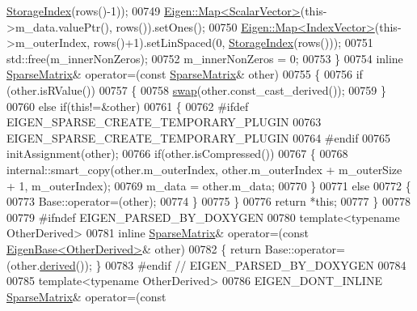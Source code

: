 \begin{DoxyCode}
      \hyperlink{group___sparse_core___module_a0b540ba724726ebe953f8c0df06081ed}{StorageIndex}(rows()-1));
00749       \hyperlink{group___core___module_class_eigen_1_1_map}{Eigen::Map<ScalarVector>}(this->m\_data.valuePtr(), rows()).setOnes();
00750       \hyperlink{group___core___module_class_eigen_1_1_map}{Eigen::Map<IndexVector>}(this->m\_outerIndex, rows()+1).setLinSpaced(0, 
      \hyperlink{group___sparse_core___module_a0b540ba724726ebe953f8c0df06081ed}{StorageIndex}(rows()));
00751       std::free(m\_innerNonZeros);
00752       m\_innerNonZeros = 0;
00753     \}
00754     \textcolor{keyword}{inline} \hyperlink{group___sparse_core___module_class_eigen_1_1_sparse_matrix}{SparseMatrix}& operator=(\textcolor{keyword}{const} \hyperlink{group___sparse_core___module_class_eigen_1_1_sparse_matrix}{SparseMatrix}& other)
00755     \{
00756       \textcolor{keywordflow}{if} (other.isRValue())
00757       \{
00758         \hyperlink{endian_8c_a3ca5ecd34b04d6a243c054ac3a57f68d}{swap}(other.const\_cast\_derived());
00759       \}
00760       \textcolor{keywordflow}{else} \textcolor{keywordflow}{if}(\textcolor{keyword}{this}!=&other)
00761       \{
00762 \textcolor{preprocessor}{        #ifdef EIGEN\_SPARSE\_CREATE\_TEMPORARY\_PLUGIN}
00763           EIGEN\_SPARSE\_CREATE\_TEMPORARY\_PLUGIN
00764 \textcolor{preprocessor}{        #endif}
00765         initAssignment(other);
00766         \textcolor{keywordflow}{if}(other.isCompressed())
00767         \{
00768           internal::smart\_copy(other.m\_outerIndex, other.m\_outerIndex + m\_outerSize + 1, m\_outerIndex);
00769           m\_data = other.m\_data;
00770         \}
00771         \textcolor{keywordflow}{else}
00772         \{
00773           Base::operator=(other);
00774         \}
00775       \}
00776       \textcolor{keywordflow}{return} *\textcolor{keyword}{this};
00777     \}
00778 
00779 \textcolor{preprocessor}{#ifndef EIGEN\_PARSED\_BY\_DOXYGEN}
00780     \textcolor{keyword}{template}<\textcolor{keyword}{typename} OtherDerived>
00781     \textcolor{keyword}{inline} \hyperlink{group___sparse_core___module_class_eigen_1_1_sparse_matrix}{SparseMatrix}& operator=(\textcolor{keyword}{const} \hyperlink{group___core___module_struct_eigen_1_1_eigen_base}{EigenBase<OtherDerived>}& other)
00782     \{ \textcolor{keywordflow}{return} Base::operator=(other.\hyperlink{group___core___module_a324b16961a11d2ecfd2d1b7dd7946545}{derived}()); \}
00783 \textcolor{preprocessor}{#endif // EIGEN\_PARSED\_BY\_DOXYGEN}
00784 
00785     \textcolor{keyword}{template}<\textcolor{keyword}{typename} OtherDerived>
00786     EIGEN\_DONT\_INLINE \hyperlink{group___sparse_core___module_class_eigen_1_1_sparse_matrix}{SparseMatrix}& operator=(\textcolor{keyword}{const} 

\end{DoxyCode}
